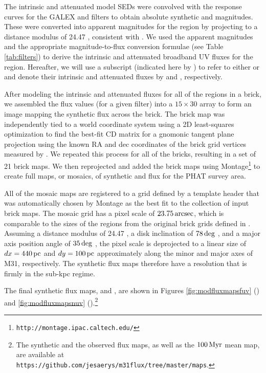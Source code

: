 \documentclass[iop, tighten]{emulateapj}
\begin{document}
The intrinsic and attenuated model SEDs were convolved with the response curves
for the GALEX \fuv{} and \nuv{} filters to obtain absolute synthetic \fuv{} and
\nuv{} magnitudes. These were converted into apparent magnitudes for the region
by projecting to a distance modulus of 24.47 \citep{McConnachie:2005},
consistent with \citet{Lewis:2014}. We used the apparent magnitudes and the
appropriate magnitude-to-flux conversion formulae (see Table \ref{tab:filters})
to derive the intrinsic and attenuated broadband UV fluxes for the region.
Hereafter, we will use a subscript (indicated here by \filter{}) to refer to
either \fuv{} or \nuv{} and denote their intrinsic and attenuated fluxes by
\fxsfhz{} and \fxsfh{}, respectively.

After modeling the intrinsic and attenuated fluxes for all of the regions in a
brick, we assembled the flux values (for a given filter) into a $15 \times 30$
array to form an image mapping the synthetic flux across the brick. The brick
map was independently tied to a world coordinate system using a 2D
least-squares optimization to find the best-fit CD matrix
\citep{Calabretta:2002} for a gnomonic tangent plane projection using the known
RA and dec coordinates of the brick grid vertices measured by
\citet{Lewis:2014}. We repeated this process for all of the \citet{Lewis:2014}
bricks, resulting in a set of 21 brick maps. We then reprojected and added the
brick maps using Montage\footnote{\texttt{http://montage.ipac.caltech.edu/}} to
create full maps, or mosaics, of synthetic \fuv{} and \nuv{} flux for the PHAT
survey area.

All of the mosaic maps are registered to a grid defined by a template header
that was automatically chosen by Montage as the best fit to the collection of
input brick maps. The mosaic grid has a pixel scale of $23.75\,\mathrm{arcsec}$, which
is comparable to the sizes of the regions from the original brick grids defined
in \citet{Lewis:2014}. Assuming a distance modulus of 24.47
\citep{McConnachie:2005}, a disk inclination of $78\,\mathrm{deg}$ \citep{Tully:1994},
and a major axis position angle of $35\,\mathrm{deg}$ \citep{deVaucouleurs:1995}, the
pixel scale is deprojected to a linear size of $dx = 440\,\mathrm{pc}$ and $dy = 100\,\mathrm{pc}$
approximately along the minor and major axes of M31, respectively. The
synthetic flux maps therefore have a resolution that is firmly in the sub-kpc
regime.

The final synthetic flux maps, \fxsfhz{} and \fxsfh{}, are shown in Figures
\ref{fig:modfluxmapsfuv} (\fuv{}) and \ref{fig:modfluxmapsnuv}
(\nuv{}).\footnote{\label{github}The synthetic and the observed flux maps, as
well as the $100\,\mathrm{Myr}$ mean \sfr{} map, are available at
\texttt{https://github.com/jesaerys/m31flux/tree/master/maps}.}
\end{document}
